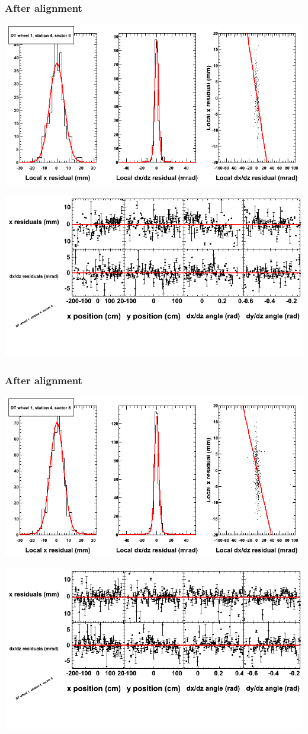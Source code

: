 \documentclass[compress]{beamer}
\begin{document}
\begin{frame}
\frametitle{After alignment}
\includegraphics[width=0.7\linewidth]{NOV4_fitfunctions/MBwhDst4sec06_bellcurves.png}

\includegraphics[width=0.7\linewidth]{NOV4_fitfunctions/MBwhDst4sec06_polynomials.png}
\end{frame}

\begin{frame}
\frametitle{After alignment}
\includegraphics[width=0.7\linewidth]{NOV4_fitfunctions/MBwhDst4sec08_bellcurves.png}

\includegraphics[width=0.7\linewidth]{NOV4_fitfunctions/MBwhDst4sec08_polynomials.png}
\end{frame}
\end{document}
